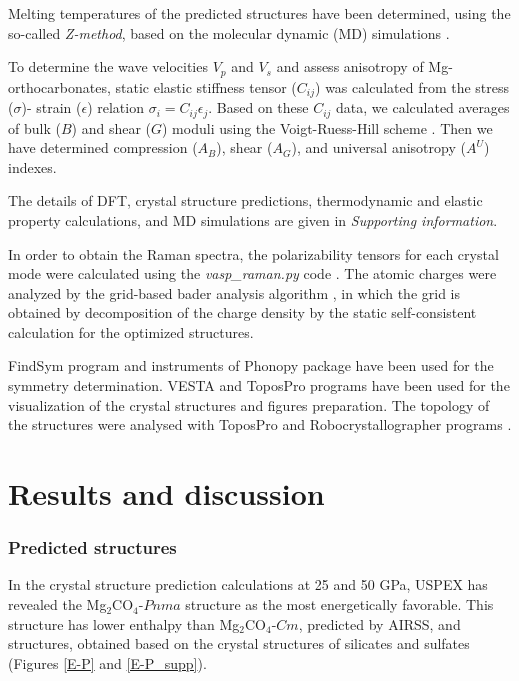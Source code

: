 \documentclass[a4paperm]{article}
\begin{document}
Melting temperatures of the predicted structures have been determined, using the so-called {\it Z-method}, based on the molecular dynamic (MD) simulations \cite{z-method}.

To determine the wave velocities $V_p$ and $V_s$ and assess anisotropy of Mg-orthocarbonates, static elastic stiffness tensor ($C_{ij}$) was calculated from the stress ($\sigma$)- strain ($\epsilon$) relation $\sigma_i=C_{ij}\epsilon_j$.
Based on these $C_{ij}$ data, we calculated averages of bulk ($B$) and shear ($G$) moduli using the Voigt-Ruess-Hill scheme \cite{hill1952,hill1963}.
 Then we have determined compression ($A_B$), shear ($A_G$), and universal anisotropy ($A^U$) indexes.

The details of DFT, crystal structure predictions, thermodynamic and elastic property calculations, and MD simulations are given in {\it Supporting information}.

{\color{blue}
In order to obtain the Raman spectra, the polarizability tensors for each crystal mode were calculated using the \textit{vasp{\_}raman.py} code \cite{vasp_raman}. 
The atomic charges were analyzed by the grid-based bader analysis algorithm \cite{bader_1,bader_2}, in which the grid is obtained by decomposition of the charge density by the static self-consistent calculation for the optimized structures.
}

FindSym program \cite{stokes2005} and instruments of Phonopy package have been used for the symmetry determination.
VESTA and ToposPro \cite{vesta,topos} programs have been used for the visualization of the crystal structures and figures preparation.
The topology of the structures were analysed with ToposPro and Robocrystallographer programs \cite{topos,robocrys}.
 

			\section*{Results and discussion}
 
\subsubsection*{Predicted structures}
In the crystal structure prediction calculations at 25 and 50 GPa, USPEX has revealed the Mg$_2$CO$_4$-$Pnma$ structure as the most energetically favorable.
This structure has lower enthalpy than Mg$_2$CO$_4$-$Cm$, predicted by AIRSS, and structures, obtained based on the crystal structures of silicates and sulfates (Figures \ref{E-P} and \ref{E-P_supp}).
\end{document}
